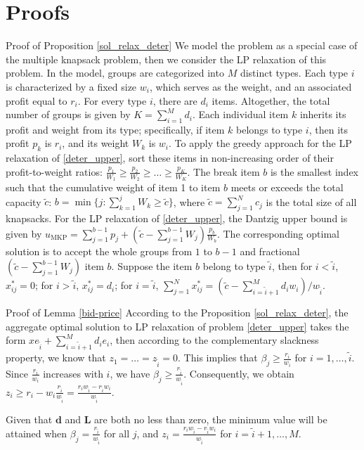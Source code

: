 \clearpage
\section{Proofs}

\begin{pf}{Proof of Proposition \ref{sol_relax_deter}}
  We model the problem as a special case of the multiple knapsack problem, then we consider the LP relaxation of this problem. In the model, groups are categorized into $M$ distinct types. Each type $i$ is characterized by a fixed size $w_i$, which serves as the weight, and an associated profit equal to $r_i$. For every type $i$, there are $d_i$ items. Altogether, the total number of groups is given by $K = \sum_{i=1}^{M} d_i$. Each individual item $k$ inherits its profit and weight from its type; specifically, if item $k$ belongs to type $i$, then its profit $p_k$ is $r_i$, and its weight $W_k$ is $w_i$. To apply the greedy approach for the LP relaxation of \eqref{deter_upper}, sort these items in non-increasing order of their profit-to-weight ratios: $\frac{p_1}{W_1} \geq \frac{p_2}{W_2} \geq \ldots \geq \frac{p_K}{W_K}$. The break item $b$ is the smallest index such that the cumulative weight of item 1 to item $b$ meets or exceeds the total capacity $\tilde{c}$: $b=\min\{j: \sum_{k=1}^j W_k \geq \tilde{c}\}$, where $\tilde{c} = \sum_{j=1}^{N} c_j$ is the total size of all knapsacks. For the LP relaxation of \eqref{deter_upper}, the Dantzig upper bound \citep{dantzig1957discrete} is given by $u_{\mathrm{MKP}}=\sum_{j=1}^{b-1} p_j+\left(\tilde{c}-\sum_{j=1}^{b-1} W_j\right) \frac{p_b}{W_b}$. The corresponding optimal solution is to accept the whole groups from $1$ to $b-1$ and fractional $(\tilde{c}-\sum_{j=1}^{b-1} W_j)$ item $b$. Suppose the item $b$ belong to type $\tilde{i}$, then for $i < \tilde{i}$, $x_{ij}^{*} = 0$; for $i > \tilde{i}$, $x_{ij}^{*} = d_{i}$; for $i = \tilde{i}$, $\sum_{j=1}^{N} x_{ij}^{*} = (\tilde{c} - \sum_{i = \tilde{i}+1}^{M} {d_i w_i})/ w_{\tilde{i}}$.
\end{pf}


\begin{pf}{Proof of Lemma \ref{bid-price}}
According to the Proposition \ref{sol_relax_deter}, the aggregate optimal solution to LP relaxation of problem \eqref{deter_upper} takes the form $x e_{\tilde{i}} + \sum_{i=\tilde{i}+1} ^{M} d_{i} e_{i}$, then according to the complementary slackness property, we know that $z_1= \ldots= z_{\tilde{i}} = 0$. This implies that $\beta_j \geq \frac{r_i}{w_i}$ for $i = 1,\ldots, \tilde{i}$. Since $\frac{r_i}{w_i}$ increases with $i$, we have $\beta_j \geq \frac{r_{\tilde{i}}}{w_{\tilde{i}}}$. Consequently, we obtain $z_{i} \geq r_i - w_i \frac{r_{\tilde{i}}}{w_{\tilde{i}}} = \frac{r_{i} w_{\tilde{i}} - r_{\tilde{i}} w_{i}}{w_{\tilde{i}}}$.

Given that $\mathbf{d}$ and $\mathbf{L}$ are both no less than zero, the minimum value will be attained when $\beta_j = \frac{r_{\tilde{i}}}{w_{\tilde{i}}}$ for all $j$, and $z_i = \frac{r_{i} w_{\tilde{i}} - r_{\tilde{i}} w_{i}}{w_{\tilde{i}}}$ for $i = \tilde{i}+1, \ldots, M$.  
\end{pf}

